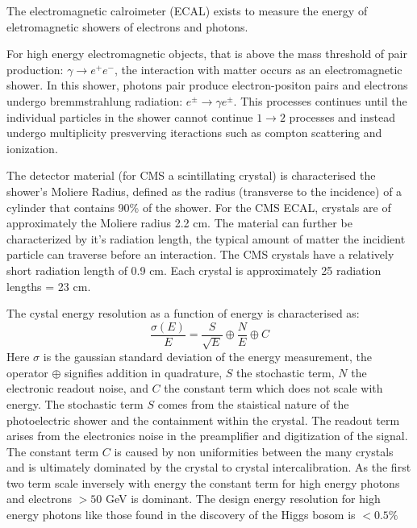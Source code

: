 The electromagnetic calroimeter (ECAL) exists to measure the energy of eletromagnetic
showers of electrons and photons.  

For high energy electromagnetic objects, that is above the mass threshold of 
pair production: $\gamma \rightarrow e^+e^-$, the interaction with matter occurs as an electromagnetic shower. In this shower, photons pair produce electron-positon pairs and
 electrons undergo bremmstrahlung 
radiation: $e^\pm \rightarrow \gamma e^\pm$. This processes continues until 
the individual particles in the shower cannot continue $1\rightarrow 2$
 processes and instead undergo multiplicity presverving iteractions such 
as compton scattering and ionization.

The detector material (for CMS a scintillating crystal) is characterised the shower's
 Moliere Radius, defined as the radius
 (transverse to the incidence) of a cylinder that contains 90\% of the shower. For the CMS ECAL, 
crystals are of approximately the Moliere radius 2.2 cm. The material can further
be characterized by it's radiation length, the typical amount of matter the incidient particle
can traverse before an interaction. The CMS crystals have a relatively short radiation
 length of 0.9 cm. Each crystal is approximately 25 radiation lengths = 23 cm. 

The cystal energy resolution as a function of energy is characterised as:
\begin{equation}
\frac{\sigma(E)}{E} = \frac{S}{\sqrt{E}} \oplus \frac{N}{E} \oplus C
\end{equation}
Here $\sigma$ is the gaussian standard deviation of the energy measurement, the operator $\oplus$ signifies addition in quadrature, $S$ the stochastic term, $N$ the
electronic readout noise, and $C$ the constant term which does not scale with energy. The 
stochastic term $S$ comes from the staistical nature of the photoelectric shower and the 
containment within the crystal. The readout term arises from the electronics noise in the preamplifier and digitization of the signal. The constant term $C$ is caused by non uniformities between
the many crystals and is ultimately dominated by the crystal to crystal intercalibration. As
the first two term scale inversely with energy the constant term for high energy photons and electrons $> 50$ GeV is dominant. The design energy resolution for high energy photons like those
found in the discovery of the Higgs bosom is $< 0.5\%$

